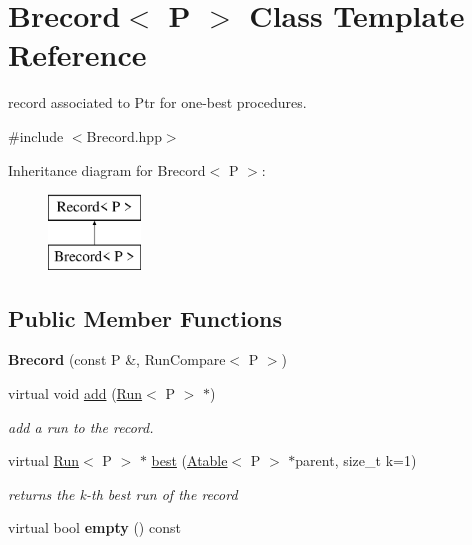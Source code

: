 \hypertarget{classBrecord}{}\section{Brecord$<$ P $>$ Class Template Reference}
\label{classBrecord}


record associated to Ptr for one-\/best procedures.  




{\ttfamily \#include $<$Brecord.\+hpp$>$}

Inheritance diagram for Brecord$<$ P $>$\+:\begin{figure}[H]
\begin{center}
\leavevmode
\includegraphics[height=2.000000cm]{classBrecord}
\end{center}
\end{figure}
\subsection*{Public Member Functions}
\begin{DoxyCompactItemize}
\item 
\mbox{\label{classBrecord_ace582d212928967716927ff6fe20c647}} 
{\bfseries Brecord} (const P \&, Run\+Compare$<$ P $>$)
\item 
\mbox{\label{classBrecord_ac7ec5cf75624a8a05fced677a477d07b}} 
virtual void \mbox{\hyperlink{classBrecord_ac7ec5cf75624a8a05fced677a477d07b}{add}} (\mbox{\hyperlink{classRun}{Run}}$<$ P $>$ $\ast$)
\begin{DoxyCompactList}\small\item\em add a run to the record. \end{DoxyCompactList}\item 
virtual \mbox{\hyperlink{classRun}{Run}}$<$ P $>$ $\ast$ \mbox{\hyperlink{classBrecord_a3e9776d16cdc2fd5c169d5599caf7c4b}{best}} (\mbox{\hyperlink{classAtable}{Atable}}$<$ P $>$ $\ast$parent, size\+\_\+t k=1)
\begin{DoxyCompactList}\small\item\em returns the k-\/th best run of the record \end{DoxyCompactList}\item 
\mbox{\label{classBrecord_ad90c15ea15523176e1db7e6e876e8ea9}} 
virtual bool {\bfseries empty} () const
\end{DoxyCompactItemize}

